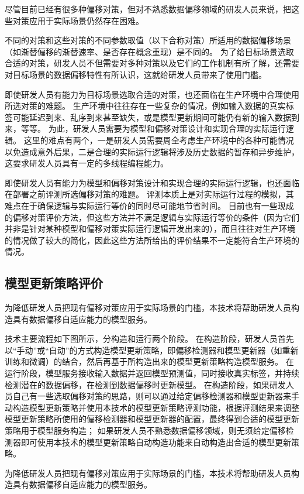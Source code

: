 尽管目前已经有很多种偏移对策，但对不熟悉数据偏移领域的研发人员来说，把这些对策应用于实际场景仍然存在困难。

不同的对策和这些对策的不同参数取值（以下合称对策）所适用的数据偏移场景（如渐替偏移的渐替速率、是否存在概念重现）是不同的。
为了给目标场景选取合适的对策，研发人员不但需要对多种对策以及它们的工作机制有所了解，还需要对目标场景的数据偏移特性有所认识，这就给研发人员带来了使用门槛。

即使研发人员有能力为目标场景选取合适的对策，也还面临在生产环境中合理使用所选对策的难题。
生产环境中往往存在一些复杂的情况，例如输入数据的真实标签可能延迟到来、乱序到来甚至缺失，或是模型更新期间可能仍有新的输入数据到来，等等。
为此，研发人员需要为模型和偏移对策设计和实现合理的实际运行逻辑。
这里的难点有两个，一是研发人员需要周全考虑生产环境中的各种可能情况以免造成意外后果，二是合理的实际运行逻辑将涉及历史数据的暂存和异步维护，这要求研发人员具有一定的多线程编程能力。

即使研发人员有能力为模型和偏移对策设计和实现合理的实际运行逻辑，也还面临在部署之前评测所选偏移对策的难题。
评测本质上是对实际运行过程的模拟，其难点在于确保逻辑与实际运行等价的同时尽可能地节省时间。
目前也有一些现成的偏移对策评价方法，但这些方法并不满足逻辑与实际运行等价的条件（因为它们并非是针对某种模型和偏移对策实际运行逻辑开发出来的），而且往往对生产环境的情况做了较大的简化，因此这些方法所给出的评价结果不一定能符合生产环境的情况。

\subsection{模型更新策略评价}

为降低研发人员把现有偏移对策应用于实际场景的门槛，本技术将帮助研发人员构造具有数据偏移自适应能力的模型服务。

技术主要流程如下图所示，分构造和运行两个阶段。
在构造阶段，研发人员首先以“手动”或“自动”的方式构造模型更新策略，即偏移检测器和模型更新器（如重新训练和微调）的结合，然后再基于所构造出来的模型更新策略构造模型服务。
在运行阶段，模型服务接收输入数据并返回模型预测值，同时接收真实标签，并持续检测潜在的数据偏移，在检测到数据偏移时更新模型。
在构造阶段，如果研发人员自己有一些选取偏移对策的思路，则可以通过给定偏移检测器和模型更新器来手动构造模型更新策略并使用本技术的模型更新策略评测功能，根据评测结果来调整模型更新策略所使用的偏移检测器和模型更新器的配置，最终得到合适的模型更新策略用于模型服务构造；
如果研发人员不熟悉数据偏移领域，则无须给定偏移检测器即可使用本技术的模型更新策略自动构造功能来自动构造出合适的模型更新策略。

为降低研发人员把现有偏移对策应用于实际场景的门槛，本技术将帮助研发人员构造具有数据偏移自适应能力的模型服务。

